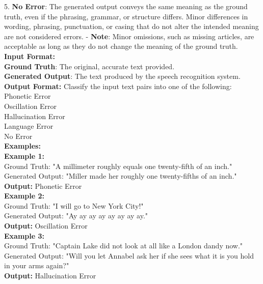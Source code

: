 \begin{figure*}[h]
\begin{tcolorbox}
    5. \textbf{No Error}: The generated output conveys the same meaning as the ground truth, even if the phrasing, grammar, or structure differs. Minor differences in wording, phrasing, punctuation, or casing that do not alter the intended meaning are not considered errors.  
       - \textbf{Note}: Minor omissions, such as missing articles, are acceptable as long as they do not change the meaning of the ground truth. \\

    \textbf{Input Format:} \\
    \textbf{Ground Truth}: The original, accurate text provided. \\
    \textbf{Generated Output}: The text produced by the speech recognition system. \\

    \textbf{Output Format:}
    Classify the input text pairs into one of the following: \\
    Phonetic Error \\
    Oscillation Error \\
    Hallucination Error \\
    Language Error \\
    No Error \\

    \textbf{Examples:} \\
    \textbf{Example 1:} \\
    Ground Truth: "A millimeter roughly equals one twenty-fifth of an inch." \\
    Generated Output: "Miller made her roughly one twenty-fifths of an inch." \\
    \textbf{Output:} Phonetic Error \\
    
    \textbf{Example 2:} \\
    Ground Truth: "I will go to New York City!" \\
    Generated Output: "Ay ay ay ay ay ay ay ay." \\
    \textbf{Output:} Oscillation Error \\
    
    \textbf{Example 3:} \\
    Ground Truth: "Captain Lake did not look at all like a London dandy now." \\
    Generated Output: "Will you let Annabel ask her if she sees what it is you hold in your arms again?" \\
    \textbf{Output:} Hallucination Error \\
    

\end{tcolorbox}
\end{figure*}
